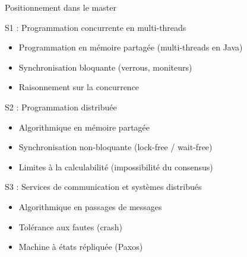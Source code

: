 
\begingroup

\begin{frame}{Positionnement dans le master}

  \begin{alertblock}{S1 : Programmation concurrente en multi-threads}
    \begin{itemize}
    \item Programmation en mémoire partagée (multi-threads en Java)
    \item Synchronisation bloquante (verrous, moniteurs)
    \item Raisonnement sur la concurrence
    \end{itemize}
  \end{alertblock}

  \begin{block}{S2 : Programmation distribuée}
    \begin{itemize}
    \item Algorithmique en mémoire partagée
    \item Synchronisation non-bloquante (lock-free / wait-free)
    \item Limites à la calculabilité (impossibilité du consensus)
    \end{itemize}
  \end{block}

  \begin{block}{S3 : Services de communication et systèmes distribués}
    \begin{itemize}
    \item Algorithmique en passages de messages
    \item Tolérance aux fautes (crash)
    \item Machine à états répliquée (Paxos)
    \end{itemize}
  \end{block}

\end{frame}

\endgroup
\endinput
